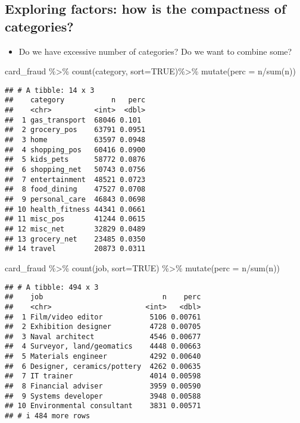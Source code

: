 \documentclass[
]{article}
\newenvironment{Shaded}{\begin{snugshade}}{\end{snugshade}}
\newcommand{\AttributeTok}[1]{\textcolor[rgb]{0.77,0.63,0.00}{#1}}
\newcommand{\ConstantTok}[1]{\textcolor[rgb]{0.00,0.00,0.00}{#1}}
\newcommand{\FunctionTok}[1]{\textcolor[rgb]{0.00,0.00,0.00}{#1}}
\newcommand{\NormalTok}[1]{#1}
\newcommand{\SpecialCharTok}[1]{\textcolor[rgb]{0.00,0.00,0.00}{#1}}
\providecommand{\tightlist}{%
  \setlength{\itemsep}{0pt}\setlength{\parskip}{0pt}}
\begin{document}
\hypertarget{exploring-factors-how-is-the-compactness-of-categories}{%
\subsection{Exploring factors: how is the compactness of
categories?}\label{exploring-factors-how-is-the-compactness-of-categories}}

\begin{itemize}
\tightlist
\item
  Do we have excessive number of categories? Do we want to combine some?
\end{itemize}

\begin{Shaded}
\begin{Highlighting}[]
\NormalTok{card\_fraud }\SpecialCharTok{\%\textgreater{}\%} 
  \FunctionTok{count}\NormalTok{(category, }\AttributeTok{sort=}\ConstantTok{TRUE}\NormalTok{)}\SpecialCharTok{\%\textgreater{}\%} 
  \FunctionTok{mutate}\NormalTok{(}\AttributeTok{perc =}\NormalTok{ n}\SpecialCharTok{/}\FunctionTok{sum}\NormalTok{(n))}
\end{Highlighting}
\end{Shaded}

\begin{verbatim}
## # A tibble: 14 x 3
##    category           n   perc
##    <chr>          <int>  <dbl>
##  1 gas_transport  68046 0.101 
##  2 grocery_pos    63791 0.0951
##  3 home           63597 0.0948
##  4 shopping_pos   60416 0.0900
##  5 kids_pets      58772 0.0876
##  6 shopping_net   50743 0.0756
##  7 entertainment  48521 0.0723
##  8 food_dining    47527 0.0708
##  9 personal_care  46843 0.0698
## 10 health_fitness 44341 0.0661
## 11 misc_pos       41244 0.0615
## 12 misc_net       32829 0.0489
## 13 grocery_net    23485 0.0350
## 14 travel         20873 0.0311
\end{verbatim}

\begin{Shaded}
\begin{Highlighting}[]
\NormalTok{card\_fraud }\SpecialCharTok{\%\textgreater{}\%} 
  \FunctionTok{count}\NormalTok{(job, }\AttributeTok{sort=}\ConstantTok{TRUE}\NormalTok{) }\SpecialCharTok{\%\textgreater{}\%} 
  \FunctionTok{mutate}\NormalTok{(}\AttributeTok{perc =}\NormalTok{ n}\SpecialCharTok{/}\FunctionTok{sum}\NormalTok{(n))}
\end{Highlighting}
\end{Shaded}

\begin{verbatim}
## # A tibble: 494 x 3
##    job                            n    perc
##    <chr>                      <int>   <dbl>
##  1 Film/video editor           5106 0.00761
##  2 Exhibition designer         4728 0.00705
##  3 Naval architect             4546 0.00677
##  4 Surveyor, land/geomatics    4448 0.00663
##  5 Materials engineer          4292 0.00640
##  6 Designer, ceramics/pottery  4262 0.00635
##  7 IT trainer                  4014 0.00598
##  8 Financial adviser           3959 0.00590
##  9 Systems developer           3948 0.00588
## 10 Environmental consultant    3831 0.00571
## # i 484 more rows
\end{verbatim}
\end{document}
